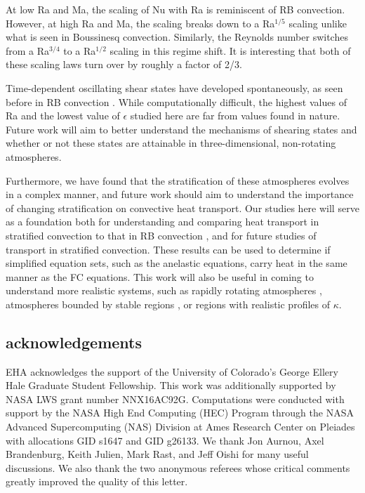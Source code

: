 \documentclass[aps, prl, twocolumn, nofootinbib, groupedaddress, amsfonts, amssymb, amsmath]{revtex4-1}
\begin{document}
At low Ra and Ma, the scaling of Nu with Ra is reminiscent of RB convection.  
However, at high Ra and Ma, the scaling breaks down to a Ra$^{1/5}$ 
scaling unlike what is seen in Boussinesq convection.  
Similarly, the Reynolds number switches from a Ra$^{3/4}$ to
a Ra$^{1/2}$ scaling in this regime shift.  
It is interesting that both of these
scaling laws turn over by roughly a factor of 2/3.

Time-dependent oscillating shear states have developed spontaneously, 
as seen before in RB convection \cite{goluskin&all2014}.  
While computationally difficult, 
the highest values of Ra and the lowest value
of $\epsilon$ studied here are far from values found in nature.  
Future work will aim to better understand the mechanisms of shearing states and
whether or not these states are attainable in 
three-dimensional, non-rotating atmospheres. 

Furthermore, we have found that the stratification of 
these atmospheres evolves in a complex
manner, and future work should aim to 
understand the importance of changing stratification on
convective heat transport. Our studies
here will serve as a foundation both for understanding and 
comparing heat transport in stratified convection
to that in RB convection \cite{johnston&doering2009}, 
and for future studies of transport in stratified convection.  
These results can be used to determine if simplified equation sets, 
such as the anelastic equations, carry heat in the same manner as the 
FC equations.
This work will also be useful in coming to understand more realistic systems, 
such as rapidly rotating atmospheres \cite{julien&all2012},
atmospheres bounded by stable regions \cite{hurlburt&all1986}, 
or regions with realistic profiles of $\kappa$.



\subsection{acknowledgements}
EHA acknowledges the support of the University of Colorado's George 
Ellery Hale Graduate Student Fellowship.
This work was additionally supported by  NASA LWS grant number NNX16AC92G.  
Computations were conducted 
with support by the NASA High End Computing (HEC) Program through the NASA 
Advanced Supercomputing (NAS) Division at Ames Research Center on Pleiades
with allocations GID s1647 and GID g26133.
We thank Jon Aurnou, Axel Brandenburg, Keith Julien, Mark Rast, and Jeff Oishi 
for many useful discussions. We also thank the two anonymous referees whose
critical comments greatly improved the quality of this letter.


\end{document}
